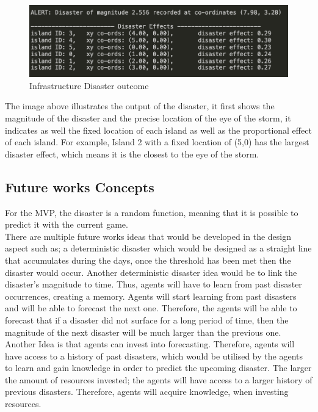 \begin{figure}[!htb]
    \centering
    \includegraphics[width=1\textwidth]{04_environment/Images/Disaster output infrastructure.png}
    \caption{Infrastructure Disaster outcome}
    \label{Images:Disaster output infrastructure}
\end{figure}

The image above illustrates the output of the disaster, it first shows the magnitude of the disaster and the precise location of the eye of the storm, it indicates as well the fixed location of each island as well as the proportional effect of each island. For example, Island 2 with a fixed location of (5,0) has the largest disaster effect, which means it is the closest to the eye of the storm.\\

\subsection{Future works Concepts}

For the MVP, the disaster is a random function, meaning that it is possible to predict it with the current game.\\

There are multiple future works ideas that would be developed in the design aspect such as; a deterministic disaster which would be  designed as a straight line that accumulates during the days, once the threshold has been met then the disaster would occur. Another deterministic disaster idea would be to link the disaster’s magnitude to time. Thus, agents will have to learn from past disaster occurrences, creating a memory. Agents will start learning from past disasters and will be able to forecast the next one. Therefore, the agents will be able to forecast that if a disaster did not surface for a long period of time, then the magnitude of the next disaster will be much larger than the previous one.\\

Another Idea is that agents can invest into forecasting. Therefore, agents will have access to a history of past disasters, which would be utilised by the agents to learn and gain knowledge in order to predict the upcoming disaster. The larger the amount of resources invested; the agents will have access to a larger history of previous disasters. Therefore, agents will acquire knowledge, when investing resources.\\

